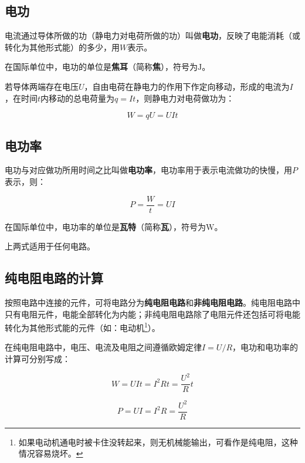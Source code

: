 
\subsection{电功}

电流通过导体所做的功（静电力对电荷所做的功）叫做\textbf{电功}，反映了电能消耗（或转化为其他形式能）的多少，用$W$表示。

在国际单位中，电功的单位是\textbf{焦耳}（简称\textbf{焦}），符号为$\mathrm{J}$。

若导体两端存在电压$U$，自由电荷在静电力的作用下作定向移动，形成的电流为$I$，在时间$t$内移动的总电荷量为$q=It$，则静电力对电荷做功为：

\begin{equation}
W=qU=UIt
\end{equation}

\subsection{电功率}

电功与对应做功所用时间之比叫做\textbf{电功率}，电功率用于表示电流做功的快慢，用$P$表示，则：

\begin{equation}
P=\frac{W}{t}=UI
\end{equation}

在国际单位中，电功率的单位是\textbf{瓦特}（简称\textbf{瓦}），符号为$\mathrm{W}$。

上两式适用于任何电路。

\subsection{纯电阻电路的计算}

按照电路中连接的元件，可将电路分为\textbf{纯电阻电路}和\textbf{非纯电阻电路}。纯电阻电路中只有电阻元件，电能全部转化为内能；非纯电阻电路除了电阻元件还包括可将电能转化为其他形式能的元件（如：电动机\footnote{如果电动机通电时被卡住没转起来，则无机械能输出，可看作是纯电阻，这种情况容易烧坏。}）。

在纯电阻电路中，电压、电流及电阻之间遵循欧姆定律$I=U/R$，电功和电功率的计算可分别写成：

\begin{equation}
W=UIt=I^2 Rt=\frac{U^2}{R}t
\end{equation}

\begin{equation}
P=UI=I^2 R=\frac{U^2}{R}
\end{equation}


